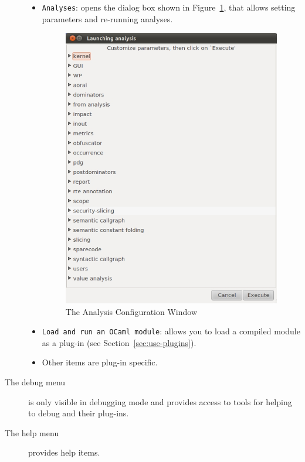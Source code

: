 \begin{description}
\begin{itemize}
\item \texttt{Analyses}: opens the dialog box shown in
  Figure~\ref{fig:launcher}, that allows setting \FramaC parameters and
  re-running analyses.
\begin{figure}[htbp!]
\begin{center}
\includegraphics [scale=0.5] {analysis-window.jpg}
\end{center}
\caption{The Analysis Configuration Window}
\label{fig:launcher}
\end{figure}
\item \texttt{Load and run an OCaml module}: allows you to load a compiled \caml
  module as a plug-in (see Section~\ref{sec:use-plugins}).
\item Other items are plug-in specific.
\end{itemize}


\item [The debug menu] is only visible in debugging mode and provides access to
  tools for helping to debug \FramaC and their plug-ins.

\item [The help menu] provides help items.
\end{description}

